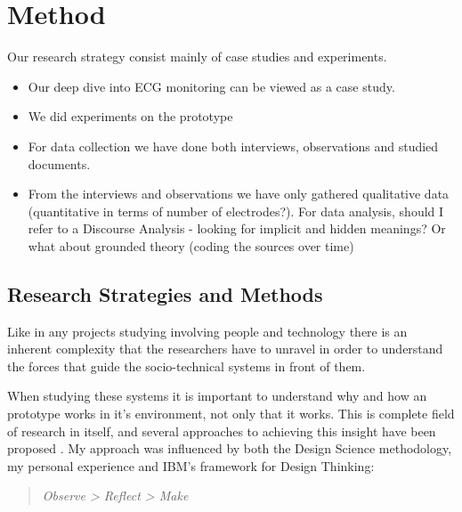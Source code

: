 \section{Method} %
\label{sec:method}

Our research strategy consist mainly of case studies and experiments.

\begin{itemize}

  \item Our deep dive into ECG monitoring can be viewed as a case study.

  \item We did experiments on the prototype

  \item For data collection we have done both interviews, observations and studied documents.

  \item From the interviews and observations we have only gathered qualitative data (quantitative in terms of number of electrodes?). For data analysis, should I refer to a Discourse Analysis - looking for implicit and hidden meanings? Or what about grounded theory (coding the sources over time)

\end{itemize}



\subsection{Research Strategies and Methods} %
\label{sub:research_strategies_and_methods}


Like in any projects studying involving people and technology there is an inherent complexity that the researchers have to unravel in order to understand the forces that guide the socio-technical systems in front of them.

When studying these systems it is important to understand why and how an prototype works in it's environment, not only that it works. This is complete field of research in itself, and several approaches to achieving this insight have been proposed \cite{DesignThinkingAndOthers}. My approach was influenced by both the Design Science methodology, my personal experience and IBM's framework for Design Thinking: 

\begin{quote} 
\textit{Observe > Reflect > Make}
\end{quote}

